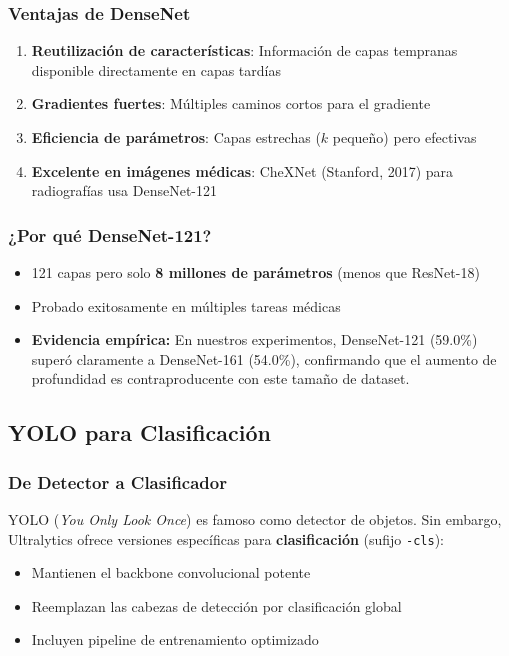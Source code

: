 \documentclass[12pt,a4paper]{article}
\begin{document}
\subsubsection{Ventajas de DenseNet}

\begin{enumerate}
    \item \textbf{Reutilización de características}: Información de capas tempranas disponible directamente en capas tardías
    \item \textbf{Gradientes fuertes}: Múltiples caminos cortos para el gradiente
    \item \textbf{Eficiencia de parámetros}: Capas estrechas ($k$ pequeño) pero efectivas
    \item \textbf{Excelente en imágenes médicas}: CheXNet (Stanford, 2017) para radiografías usa DenseNet-121
\end{enumerate}

\subsubsection{¿Por qué DenseNet-121?}

\begin{itemize}
    \item 121 capas pero solo \textbf{8 millones de parámetros} (menos que ResNet-18)
    \item Probado exitosamente en múltiples tareas médicas
    \item \textbf{Evidencia empírica:} En nuestros experimentos, DenseNet-121 (59.0\%) superó claramente a DenseNet-161 (54.0\%), confirmando que el aumento de profundidad es contraproducente con este tamaño de dataset.
\end{itemize}

\subsection{YOLO para Clasificación}

\subsubsection{De Detector a Clasificador}

YOLO (\textit{You Only Look Once}) es famoso como detector de objetos. Sin embargo, Ultralytics ofrece versiones específicas para \textbf{clasificación} (sufijo \texttt{-cls}):

\begin{itemize}
    \item Mantienen el backbone convolucional potente
    \item Reemplazan las cabezas de detección por clasificación global
    \item Incluyen pipeline de entrenamiento optimizado
\end{itemize}
\end{document}
